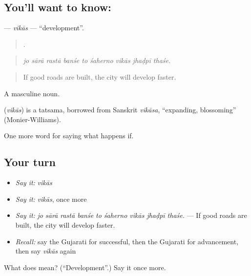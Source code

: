 \subsection*{You'll want to know: }
\textbf{} — \emph{vikās} — \textquotedblleft{}development\textquotedblright{}.

\begin{quote}
        .
\end{quote}

\begin{quote}
\emph{jo sārā rastā banśe to śaherno vikās jhaḍpī thaśe.}
\end{quote}

\begin{quote}
If good roads are built, the city will develop faster.
\end{quote}

A masculine noun.

\begin{cousinweb}
\textbf{} (\emph{vikās}) is a tatsama, borrowed from Sanskrit \emph{vikāsa}, \textquotedblleft{}expanding, blossoming\textquotedblright{} (Monier-Williams).
\end{cousinweb}

\begin{grammarlens}[title={What you've built}]
One more word for saying what happens if.
\end{grammarlens}

\subsection*{Your turn}
\begin{itemize}
\raggedright
  \item \emph{Say it:} \emph{vikās}
  \item \emph{Say it:} \emph{vikās}, once more
  \item \emph{Say it:} \emph{jo sārā rastā banśe to śaherno vikās jhaḍpī thaśe.} — If good roads are built, the city will develop faster.
  \item \emph{Recall:} say the Gujarati for successful, then the Gujarati for advancement, then say \emph{vikās} again
\end{itemize}

\begin{tcolorbox}[breakable,colback=teal!4,colframe=teal!35!black,title={Before you move on}]
What does  mean? (\textquotedblleft{}Development\textquotedblright{}.) Say it once more.
\end{tcolorbox}
